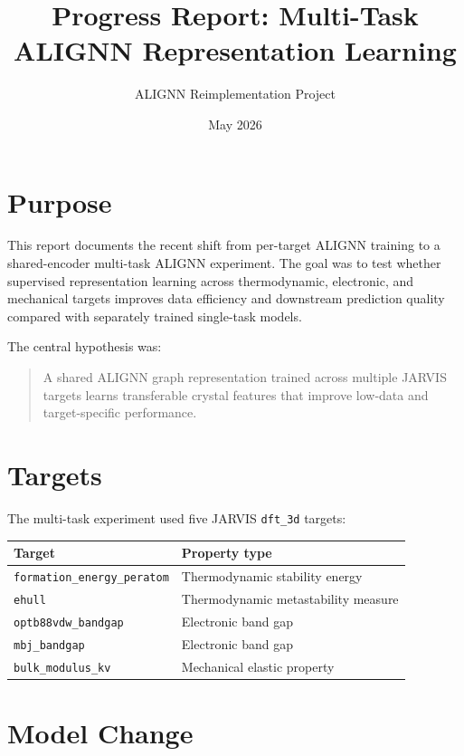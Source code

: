 \documentclass[11pt,a4paper]{article}
\title{Progress Report: Multi-Task ALIGNN Representation Learning}
\author{ALIGNN Reimplementation Project}
\date{May 2026}
\begin{document}
\maketitle

\section{Purpose}

This report documents the recent shift from per-target ALIGNN training to a shared-encoder multi-task ALIGNN experiment.  The goal was to test whether supervised representation learning across thermodynamic, electronic, and mechanical targets improves data efficiency and downstream prediction quality compared with separately trained single-task models.

The central hypothesis was:

\begin{quote}
A shared ALIGNN graph representation trained across multiple JARVIS targets learns transferable crystal features that improve low-data and target-specific performance.
\end{quote}

\section{Targets}

The multi-task experiment used five JARVIS \texttt{dft\_3d} targets:

\begin{center}
\begin{tabular}{ll}
\toprule
Target & Property type \\
\midrule
\texttt{formation\_energy\_peratom} & Thermodynamic stability energy \\
\texttt{ehull} & Thermodynamic metastability measure \\
\texttt{optb88vdw\_bandgap} & Electronic band gap \\
\texttt{mbj\_bandgap} & Electronic band gap \\
\texttt{bulk\_modulus\_kv} & Mechanical elastic property \\
\bottomrule
\end{tabular}
\end{center}

\section{Model Change}
\end{document}
